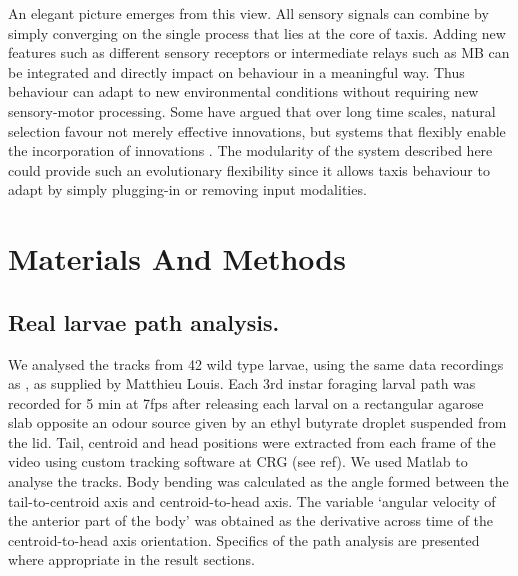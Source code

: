 \documentclass[10pt,a4paper]{article}
\begin{document}
An elegant picture emerges from this view. All sensory signals can combine by simply converging on the single process that lies at the core of taxis. Adding new features such as different sensory receptors or intermediate relays such as MB can be integrated and directly impact on behaviour in a meaningful way. Thus behaviour can adapt to new environmental conditions  without requiring new sensory-motor processing. Some have argued that over long time scales, natural selection favour not merely effective innovations, but systems that flexibly enable the incorporation of innovations \citep{vermeij1973adaptation}. The modularity of the system described here could provide such an evolutionary flexibility since it allows taxis behaviour to adapt by simply plugging-in or removing input modalities. 



\section{Materials And Methods}
\subsection{Real larvae path analysis.}
We analysed the tracks from 42 wild type larvae, using the same data recordings as \cite{gomez2011active}, as supplied by Matthieu Louis. Each 3rd instar foraging larval path was recorded for 5 min at 7fps after releasing each larval on a rectangular agarose slab opposite an odour source given by an ethyl butyrate droplet suspended from the lid. Tail, centroid and head positions were extracted from each frame of the video using custom tracking software at CRG (see ref). We used Matlab to analyse the tracks. Body bending was calculated as the angle formed between the tail-to-centroid axis and centroid-to-head axis. The variable ‘angular velocity of the anterior part of the body’ was obtained as the derivative across time of the centroid-to-head axis orientation. Specifics of the path analysis are presented where appropriate in the result sections. 
\end{document}
